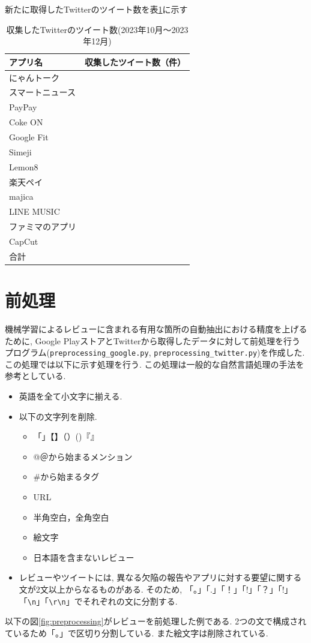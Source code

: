 新たに取得したTwitterのツイート数を表\ref{tb:rawtweetnum2023}に示す

\begin{table}[H]
  \caption{収集したTwitterのツイート数(2023年10月〜2023年12月)}
  \label{tb:rawtweetnum2023}
  \begin{center}
  \begin{tabular}{l|l}
    \hline
    アプリ名&収集したツイート数（件）\\\hline\hline
    にゃんトーク&\\\hline
    スマートニュース&\\\hline
    PayPay&\\\hline
    Coke ON&\\\hline
    Google Fit&\\\hline
    Simeji&\\\hline
    Lemon8&\\\hline
    楽天ペイ&\\\hline
    majica&\\\hline
    LINE MUSIC&\\\hline
    ファミマのアプリ&\\\hline
    CapCut&\\\hline\hline
    合計&
  \end{tabular}\end{center}
\end{table}


\section{前処理}
機械学習によるレビューに含まれる有用な箇所の自動抽出における精度を上げるために, Google PlayストアとTwitterから取得したデータに対して前処理を行うプログラム(\verb|preprocessing_google.py|, \verb|preprocessing_twitter.py|)を作成した. この処理では以下に示す処理を行う. この処理は一般的な自然言語処理の手法を参考としている. 
\begin{itemize}
  \item 英語を全て小文字に揃える. 
  \item 以下の文字列を削除. 
    \begin{itemize}
      \item 「」【】（）()『』
      \item @＠から始まるメンション
      \item \#から始まるタグ
      \item URL
      \item 半角空白，全角空白
      \item 絵文字
      \item 日本語を含まないレビュー
    \end{itemize}
  \item レビューやツイートには, 異なる欠陥の報告やアプリに対する要望に関する文が2文以上からなるものがある. そのため, 「。」「.」「！」「!」「？」「!」「\verb|\n|」「\verb|\r\n|」でそれぞれの文に分割する. 
\end{itemize}
以下の図\ref{fig:preprocessing}がレビューを前処理した例である. 2つの文で構成されているため「。」で区切り分割している. また絵文字は削除されている. 

